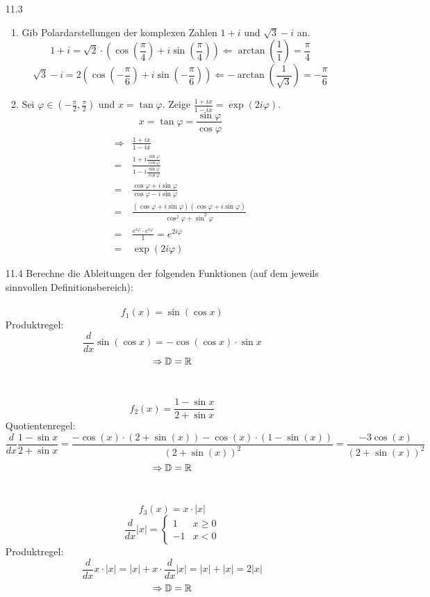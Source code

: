 \documentclass{HM}
\begin{document}
\begin{enumerate}
\item[11.3]
\begin{enumerate}
	\item Gib Polardarstellungen der komplexen Zahlen $1+i$ und $\sqrt{3}-i$ an.
	$$1+i = \sqrt{2}\cdot \left(\cos\left(\frac{\pi}{4}\right)+i\sin\left(\frac{\pi}{4}\right)\right) \Leftarrow \arctan\left(\frac{1}{1}\right)=\frac{\pi}{4}$$
	$$\sqrt{3}-i=2\left(\cos\left(-\frac{\pi}{6}\right)+i\sin\left(-\frac{\pi}{6}\right)\right) \Leftarrow -\arctan\left(\frac{1}{\sqrt{3}}\right)=-\frac{\pi}{6}$$
	\item Sei $\varphi\in\left(-\frac{\pi}{2},\frac{\pi}{2}\right)$ und $x=\tan\varphi$. Zeige $\frac{1+ix}{1-ix}=\exp(2i\varphi)$.
	$$x=\tan\varphi=\frac{\sin\varphi}{\cos\varphi}$$
	\begin{align*}
		\Rightarrow &\frac{1+ix}{1-ix}\\
		=&\frac{1+i\frac{\sin\varphi}{\cos\varphi}}{1-i\frac{\sin\varphi}{\cos\varphi}}\\
		=&\frac{\cos\varphi+i\sin\varphi}{\cos\varphi-i\sin\varphi}\\
		=&\frac{(\cos\varphi+i\sin\varphi)(\cos\varphi+i\sin\varphi)}{\cos^2\varphi+\sin^2\varphi}\\
		=&\frac{e^{i\varphi}\cdot e^{i\varphi}}{1}=e^{2i\varphi}\\
		=&\exp(2i\varphi)	
	\end{align*}
\end{enumerate}
\item [11.4] Berechne die Ableitungen der folgenden Funktionen (auf dem jeweils sinnvollen Definitionsbereich):\\\\
$$f_1(x)=\sin(\cos x)$$
Produktregel:
$$\frac{d}{dx}\sin(\cos x) = -\cos(\cos x)\cdot\sin x$$
$$\Rightarrow\mathbb{D}=\mathbb{R}$$\\\\

\newpage
$$f_2(x)=\frac{1-\sin x}{2+\sin x}$$
Quotientenregel:
$$\frac{d}{dx}\frac{1-\sin x}{2+\sin x}=\frac{-\cos(x)\cdot(2+\sin(x))-\cos(x)\cdot(1-\sin(x))}{(2+\sin(x))^2}=\frac{-3\cos(x)}{(2+\sin(x))^2}$$
$$\Rightarrow\mathbb{D}=\mathbb{R}$$\\\\

$$f_3(x)=x\cdot|x|$$
$$\frac{d}{dx}|x|=\begin{cases}
1&x\geq0\\
-1&x<0
\end{cases}$$
Produktregel:
$$\frac{d}{dx}x\cdot|x|=|x|+x\cdot\frac{d}{dx}|x|=|x|+|x|=2|x|$$
$$\Rightarrow\mathbb{D}=\mathbb{R}$$\\\\


\end{enumerate}
\end{document}
